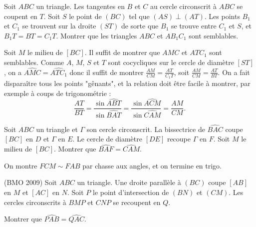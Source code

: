\begin{exo}
Soit $ABC$ un triangle. Les tangentes en $B$ et $C$ au cercle
circonscrit \`a $ABC$ se coupent en $T$. Soit $S$ le point de $(BC)$ tel que $(AS)\perp (AT)$.
Les points $B_1$ et $C_1$ se trouvent sur la droite $(ST)$ de sorte que $B_1$ se trouve
entre $C_1$ et $S$, et $B_1T=BT=C_1T$. Montrer que les triangles $ABC$ et $AB_1C_1$ sont semblables.
\end{exo}

\begin{sol}
Soit $M$ le milieu de $[BC]$. Il suffit de montrer que $AMC$ et $ATC_1$ sont semblables. Comme $A$, $M$, $S$ et $T$ sont cocycliques sur le cercle de diamètre $[ST]$, on a $\widehat{AMC}=\widehat{ATC_1}$ donc il suffit de montrer $\frac{AM}{CM}=\frac{AT}{C_1 T}$, soit $\frac{AM}{CM}=\frac{AT}{BT}$. On a fait disparaître tous les points "gênants", et la relation doit être facile à montrer, par exemple à coups de trigonométrie :
\[\frac{AT}{BT}=\frac{\sin \widehat{ABT}}{\sin \widehat{BAT}}=\frac{\sin \widehat{ACM}}{\sin \widehat{CAM}}=\frac{AM}{CM}.\]
\end{sol}

\begin{exo}
Soit $ABC$ un triangle et $\Gamma$ son cercle circonscrit. La bissectrice de $\widehat{BAC}$ coupe $[BC]$ en $D$ et $\Gamma$ en $E$. Le cercle de diamètre $[DE]$ recoupe $\Gamma$ en $F$. Soit $M$ le milieu de $[BC]$. Montrer que $\widehat{BAF}=\widehat{CAM}$.
\end{exo}

\begin{sol}
On montre $FCM \sim FAB$ par chasse aux angles, et on termine en trigo.
\end{sol}

\begin{exo}(BMO 2009)
Soit $ABC$ un triangle. Une droite parallèle \`a $(BC)$ coupe $[AB]$ en $M$ et $[AC]$ en $N$. Soit $P$ le point d'intersection de $(BN)$ et $(CM)$. Les cercles circonscrits \`a $BMP$ et $CNP$ se recoupent en $Q$.

Montrer que $\widehat{PAB}=\widehat{QAC}$.
\end{exo}

